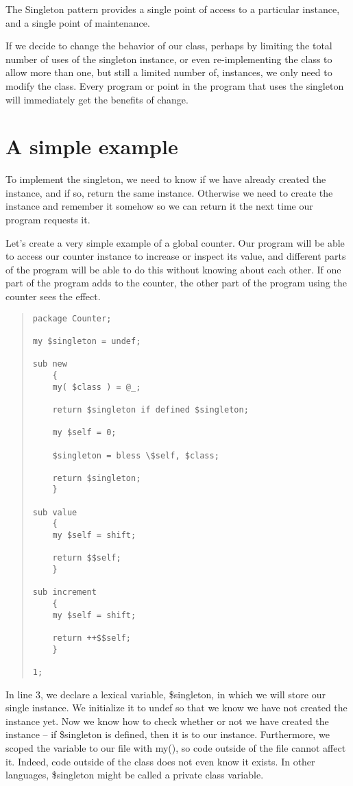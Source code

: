 The Singleton pattern provides a single point of access to a
particular instance, and a single point of maintenance.

If we decide to change the behavior of our class, perhaps
by limiting the total number of uses of the singleton
instance, or even re-implementing the class to allow more
than one, but still a limited number of, instances, we only
need to modify the class. Every program or point in the program
that uses the singleton will immediately get the benefits of
change.

    \section{A simple example}

To implement the singleton, we need to know if we have already
created the instance, and if so, return the same instance.  Otherwise
we need to create the instance and remember it somehow so we can 
return it the next time our program requests it.

Let's create a very simple example of a global counter.  Our program
will be able to access our counter instance to increase or inspect
its value, and different parts of the program will be able to do this
without knowing about each other.  If one part of the program adds to
the counter, the other part of the program using the counter sees the
effect. 

\begin{quote}    
\begin{verbatim}
package Counter;

my $singleton = undef;

sub new
    {
    my( $class ) = @_;

    return $singleton if defined $singleton;

    my $self = 0;

    $singleton = bless \$self, $class;

    return $singleton;
    }

sub value
    {
    my $self = shift;

    return $$self;
    }

sub increment
    {
    my $self = shift;

    return ++$$self;
    }

1;
\end{verbatim}
\end{quote}    

In line 3, we declare a lexical variable, \$singleton, in which we
will store our single instance.  We initialize it to undef so that
we know we have not created the instance yet.  Now we know how to
check whether or not we have created the instance -- if \$singleton
is defined, then it is to our instance.  Furthermore, we scoped the
variable to our file with my(), so code outside of the file cannot
affect it.  Indeed, code outside of the class does not even know
it exists. In other languages, \$singleton might be called a private
class variable.

